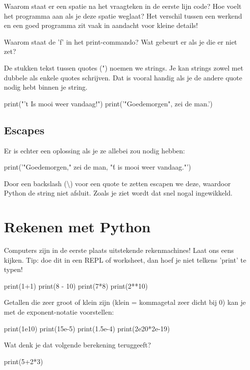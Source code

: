 \documentclass[10pt,a4paper]{article}
\newenvironment{task}{\smallpencil}{}
\newcommand{\optional}{\Info \thinspace}
\begin{document}
\begin{task}
Waarom staat er een spatie na het vraagteken in de eerste lijn code? Hoe voelt het programma aan als je deze spatie weglaat? Het verschil tussen een werkend en een goed programma zit vaak in aandacht voor kleine details!
\end{task}

\begin{task}
Waarom staat de 'f' in het print-commando? Wat gebeurt er als je die er niet zet?
\end{task}

De stukken tekst tussen quotes (") noemen we strings. Je kan strings zowel met dubbele als enkele quotes schrijven. Dat is vooral handig als je de andere quote nodig hebt binnen je string.
\begin{python}
print("'t Is mooi weer vandaag!")
print('"Goedemorgen", zei de man.')
\end{python}

\subsection{\optional Escapes}
Er is echter een oplossing als je ze allebei zou nodig hebben:
\begin{python}
print('"Goedemorgen," zei de man, "\'t is mooi weer vandaag."')
\end{python}
Door een backslash (\textbackslash) voor een quote te zetten escapen we deze, waardoor Python de string niet afsluit. Zoals je ziet wordt dat snel nogal ingewikkeld.

\section{Rekenen met Python}
Computers zijn in de eerste plaats uitstekende rekenmachines! Laat ons eens kijken. Tip: doe dit in een REPL of worksheet, dan hoef je niet telkens 'print' te typen!

\begin{python}
print(1+1)
print(8 - 10)
print(7*8)
print(2**10)
\end{python}

Getallen die zeer groot of klein zijn (klein = kommagetal zeer dicht bij 0) kan je met de exponent-notatie voorstellen:
\begin{python}
print(1e10)
print(15e-5)
print(1.5e-4)
print(2e20*2e-19)
\end{python}

\begin{task}
Wat denk je dat volgende berekening teruggeeft?
\end{task}
\begin{python}
print(5+2*3)
\end{python}
\end{document}
